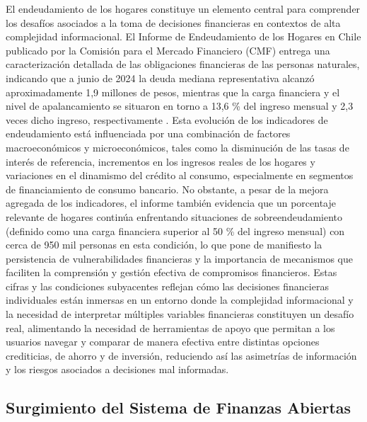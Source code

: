 \documentclass[
	spanish, %
	letterpaper, oneside
]{book}
\begin{document}
El endeudamiento de los hogares constituye un elemento central para comprender los desafíos asociados a la toma de decisiones financieras en contextos de alta complejidad informacional. El Informe de Endeudamiento de los Hogares en Chile publicado por la Comisión para el Mercado Financiero (CMF) entrega una caracterización detallada de las obligaciones financieras de las personas naturales, indicando que a junio de 2024 la deuda mediana representativa alcanzó aproximadamente 1,9 millones de pesos, mientras que la carga financiera y el nivel de apalancamiento se situaron en torno a 13,6 \% del ingreso mensual y 2,3 veces dicho ingreso, respectivamente \cite{cmf2024endeudamiento}. Esta evolución de los indicadores de endeudamiento está influenciada por una combinación de factores macroeconómicos y microeconómicos, tales como la disminución de las tasas de interés de referencia, incrementos en los ingresos reales de los hogares y variaciones en el dinamismo del crédito al consumo, especialmente en segmentos de financiamiento de consumo bancario. No obstante, a pesar de la mejora agregada de los indicadores, el informe también evidencia que un porcentaje relevante de hogares continúa enfrentando situaciones de sobreendeudamiento (definido como una carga financiera superior al 50 \% del ingreso mensual) con cerca de 950 mil personas en esta condición, lo que pone de manifiesto la persistencia de vulnerabilidades financieras y la importancia de mecanismos que faciliten la comprensión y gestión efectiva de compromisos financieros. Estas cifras y las condiciones subyacentes reflejan cómo las decisiones financieras individuales están inmersas en un entorno donde la complejidad informacional y la necesidad de interpretar múltiples variables financieras constituyen un desafío real, alimentando la necesidad de herramientas de apoyo que permitan a los usuarios navegar y comparar de manera efectiva entre distintas opciones crediticias, de ahorro y de inversión, reduciendo así las asimetrías de información y los riesgos asociados a decisiones mal informadas.


\subsection{Surgimiento del Sistema de Finanzas Abiertas}
\end{document}
